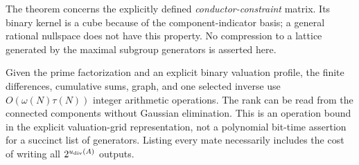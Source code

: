 \begin{remark}\label{v2:rem:rank-scope}
The theorem concerns the explicitly defined \emph{conductor-constraint} matrix. Its binary kernel is a cube because of the component-indicator basis; a general rational nullspace does not have this property. No compression to a lattice generated by the maximal subgroup generators is asserted here.

Given the prime factorization and an explicit binary valuation profile, the finite differences, cumulative sums, graph, and one selected inverse use $O(\omega(N)\tau(N))$ integer arithmetic operations. The rank can be read from the connected components without Gaussian elimination. This is an operation bound in the explicit valuation-grid representation, not a polynomial bit-time assertion for a succinct list of generators. Listing every mate necessarily includes the cost of writing all $2^{u_{\rm div}(A)}$ outputs.
\end{remark}
